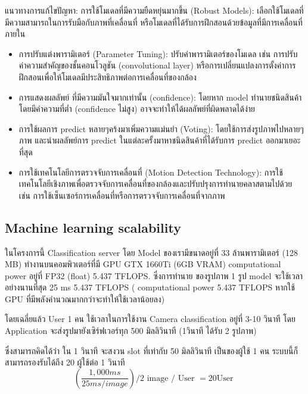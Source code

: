 แนวทางการแก้ไขปัญหา:
การใช้โมเดลที่มีความยืดหยุ่นมากขึ้น (Robust Models): เลือกใช้โมเดลที่มีความสามารถในการรับมือกับภาพที่เคลื่อนที่ หรือโมเดลที่ได้รับการฝึกสอนด้วยข้อมูลที่มีการเคลื่อนที่ภายใน
\begin{itemize}
    \item การปรับแต่งพารามิเตอร์ (Parameter Tuning): ปรับค่าพารามิเตอร์ของโมเดล เช่น การปรับค่าความสำคัญของชั้นคอนโวลูชัน (convolutional layer) หรือการเปลี่ยนแปลงการตั้งค่าการฝึกสอนเพื่อให้โมเดลมีประสิทธิภาพต่อการเคลื่อนที่ของกล้อง
    \item การแสดงผลลัพย์ ที่มีความมันใจมากเท่านั้น  (confidence): โดยหาก model ทำนายชนิดสินค้าโดยมีค่าความที่ต่ำ (confidence ไม่สูง) อาจจะทำให้ได้ผลลัพย์ที่ผิดพลาดได้ง่าย
    \item การใช้ผลการ predict หลายๆคร้งมาเพิ่มความแม่นยำ (Voting): โดยใช้การส่งรูปภาพไปหลายๆภาพ และนำผลลัพย์การ predict ในแต่ละครั้งมาหาชนิดสินค้าที่ได้รับการ predict ออกมาเยอะที่สุด
    \item การใช้เทคโนโลยีการตรวจจับการเคลื่อนที่ (Motion Detection Technology): การใช้เทคโนโลยีเชิงภาพเพื่อตรวจจับการเคลื่อนที่ของกล้องและปรับปรุงการทำนายคลาสตามไปด้วย เช่น การใช้เซ็นเซอร์การเคลื่อนที่หรือการตรวจจับการเคลื่อนที่จากภาพ
\end{itemize}

\subsection{Machine learning scalability}
\par ในโครงการนี้ Classification server โดย Model ของเรามีขนาดอยู่ที่ 33 ล้านพารามิเตอร์ (128 MB)
ทำงานบนคอมพิวเตอร์ที่มี GPU GTX 1660Ti (6GB VRAM)  computational power อยู่ที่ FP32 (float) 5.437 TFLOPS.
ซึ่งการทำนาย ของรูปภาพ 1 รูป model จะใช้เวลาอย่างนานที่สุด 25 ms
5.437 TFLOPS ( computational power 5.437 TFLOPS หากใช้ GPU ที่มีพลังคำนวณมากกว่าจะทำให้ใช้เวลาน้อยลง)

โดยเฉลี่ยแล้ว User 1 คน ใช้เวลาในการใช้งาน Camera classification อยู่ที่ 3-10 วินาที
โดย Application จะส่งรูปมายังเซิร์ฟเวอร์ทุก 500 มิลลิวินาที (1วินาที ได้รับ 2 รูปภาพ)

ซึ่งสามารถคิดได้ว่า ใน 1 วินาที จะสงวน slot ที่เท่ากับ 50 มิลลิวินาที เป็นของผู้ใช้ 1 คน
ระบบนี้ก็สามารถรองรับได้ถึง 20 ผู้ใช้ต่อ 1 วินาที
\begin{equation}
    ({\frac {1,000 ms}{25 ms / image}} )  / 2 \text{ image / User }  = 20 \text{User }
\end{equation}


